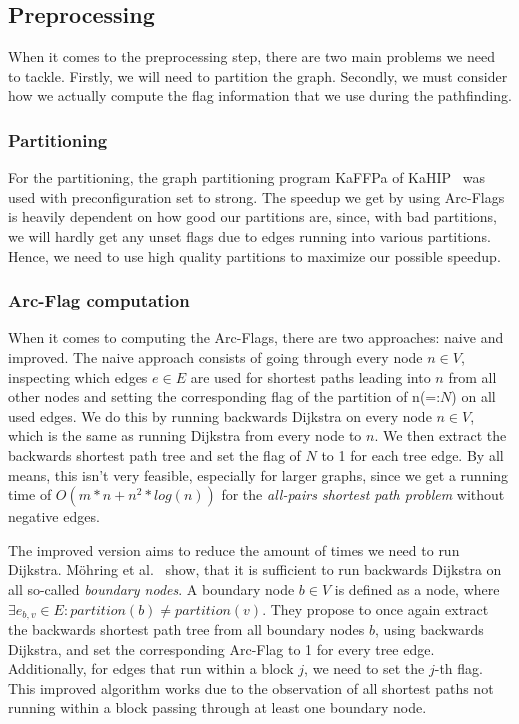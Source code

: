 \documentclass[acmsmall,nonacm,screen,review]{acmart}
\begin{document}
\subsection{Preprocessing}
\label{4.2}
When it comes to the preprocessing step, there are two main problems we need to tackle. Firstly, we will need to partition the graph.
Secondly, we must consider how we actually compute the flag information that we use during the pathfinding.

\subsubsection{Partitioning}
For the partitioning, the graph partitioning program KaFFPa of KaHIP~\cite{DBLP:conf/wea/SandersS13} was used with preconfiguration set to strong. The speedup we get by using Arc-Flags is
heavily dependent on how good our partitions are, since, with bad partitions, we will hardly get any unset flags due to edges running into
various partitions. Hence, we need to use high quality partitions to maximize our possible speedup.

\subsubsection{Arc-Flag computation}
When it comes to computing the Arc-Flags, there are two approaches: naive and improved.
The naive approach consists of going through every node $n \in V$, inspecting which edges $e \in E$ are used for shortest paths leading into $n$ from all other
nodes and setting the corresponding flag of the partition of n(=:$N$) on all used edges. We do this by running backwards Dijkstra on every node $n \in V$,
which is the same as running Dijkstra from every node to $n$. We then extract the backwards shortest path tree and set the flag of $N$ to 1 for each tree
edge. By all means, this isn't very feasible, especially for larger graphs, since we get a running time of $O(m*n + n^2*log(n))$ for the
\textit{all-pairs shortest path problem} without negative edges.

The improved version aims to reduce the amount of times we need to run Dijkstra. Möhring et al.~\cite{DBLP:journals/jea/MohringSSWW06} show,
that it is sufficient to run backwards Dijkstra
on all so-called \textit{boundary nodes}. A boundary node $b \in V$  is defined as a node, where $\exists e_{b,v} \in E : partition(b) \neq partition(v)$.
They propose to once again extract the backwards shortest path tree from all boundary nodes $b$, using backwards Dijkstra, and set the corresponding Arc-Flag
to 1 for every tree edge. Additionally, for edges that run within a block $j$, we need to set the $j$-th flag.
This improved algorithm works due to the observation of all shortest paths not
running within a block passing through at least one boundary node.
\end{document}
